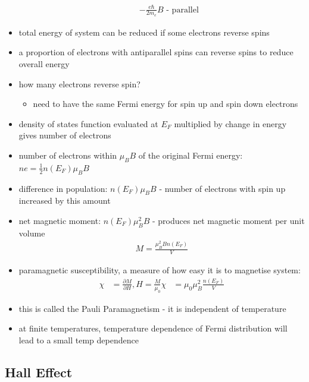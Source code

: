 \documentclass[a4paper,11pt,normalem]{article}
\begin{document}
\begin{itemize}
\begin{itemize}
                \begin{align*}
                    - \frac{e\hbar}{2m_e}B \text{ - parallel}
                \end{align*}
        \end{itemize}
    \item total energy of system can be reduced if some electrons reverse spins
    \item a proportion of electrons with antiparallel spins can reverse spins to reduce overall energy
    \item how many electrons reverse spin?
        \begin{itemize}
            \item need to have the same Fermi energy for spin up and spin down electrons
        \end{itemize}
    \item density of states function evaluated at \(E_F\) multiplied by change in energy gives number of electrons
    \item number of electrons within \(\mu_BB\) of the original Fermi energy: \(ne = \frac{1}{2}n(E_F)\mu_BB\)
    \item difference in population: \(n(E_F)\mu_BB\) - number of electrons with spin up increased by this amount
    \item net magnetic moment: \(n(E_F)\mu_B^2B\) - produces net magnetic moment per unit volume
        \begin{align*}
            M = \frac{\mu_B^2Bn(E_F)}{V}
        \end{align*}
    \item paramagnetic susceptibility, a measure of how easy it is to magnetise system:
        \begin{align*}
            \chi &= \frac{\partial M}{\partial H}, H = \frac{M}{\mu_0}
            \chi &= \mu_0\mu_B^2\frac{n(E_F)}{V}
        \end{align*}
    \item this is called the Pauli Paramagnetism - it is independent of temperature
    \item at finite temperatures, temperature dependence of Fermi distribution will lead to a small temp dependence
\end{itemize}

\subsection{Hall Effect}
\end{document}
